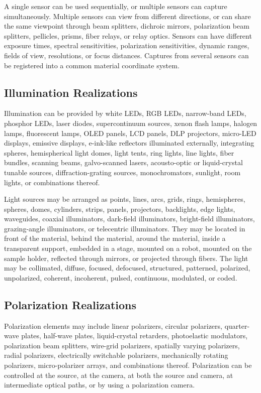 \documentclass[11pt, twoside, listof=totocnumbered, bibliography=totocnumbered]{scrartcl}
\begin{document}
	A single sensor can be used sequentially, or multiple sensors can capture simultaneously. Multiple sensors can view from different directions, or can share the same viewpoint through beam splitters, dichroic mirrors, polarization beam splitters, pellicles, prisms, fiber relays, or relay optics. Sensors can have different exposure times, spectral sensitivities, polarization sensitivities, dynamic ranges, fields of view, resolutions, or focus distances. Captures from several sensors can be registered into a common material coordinate system.
	
	\subsection{Illumination Realizations}
	Illumination can be provided by white LEDs, RGB LEDs, narrow-band LEDs, phosphor LEDs, laser diodes, supercontinuum sources, xenon flash lamps, halogen lamps, fluorescent lamps, OLED panels, LCD panels, DLP projectors, micro-LED displays, emissive displays, e-ink-like reflectors illuminated externally, integrating spheres, hemispherical light domes, light tents, ring lights, line lights, fiber bundles, scanning beams, galvo-scanned lasers, acousto-optic or liquid-crystal tunable sources, diffraction-grating sources, monochromators, sunlight, room lights, or combinations thereof.
	
	Light sources may be arranged as points, lines, arcs, grids, rings, hemispheres, spheres, domes, cylinders, strips, panels, projectors, backlights, edge lights, waveguides, coaxial illuminators, dark-field illuminators, bright-field illuminators, grazing-angle illuminators, or telecentric illuminators. They may be located in front of the material, behind the material, around the material, inside a transparent support, embedded in a stage, mounted on a robot, mounted on the sample holder, reflected through mirrors, or projected through fibers. The light may be collimated, diffuse, focused, defocused, structured, patterned, polarized, unpolarized, coherent, incoherent, pulsed, continuous, modulated, or coded.
	
	\subsection{Polarization Realizations}
	Polarization elements may include linear polarizers, circular polarizers, quarter-wave plates, half-wave plates, liquid-crystal retarders, photoelastic modulators, polarization beam splitters, wire-grid polarizers, spatially varying polarizers, radial polarizers, electrically switchable polarizers, mechanically rotating polarizers, micro-polarizer arrays, and combinations thereof. Polarization can be controlled at the source, at the camera, at both the source and camera, at intermediate optical paths, or by using a polarization camera.
	
\end{document}
